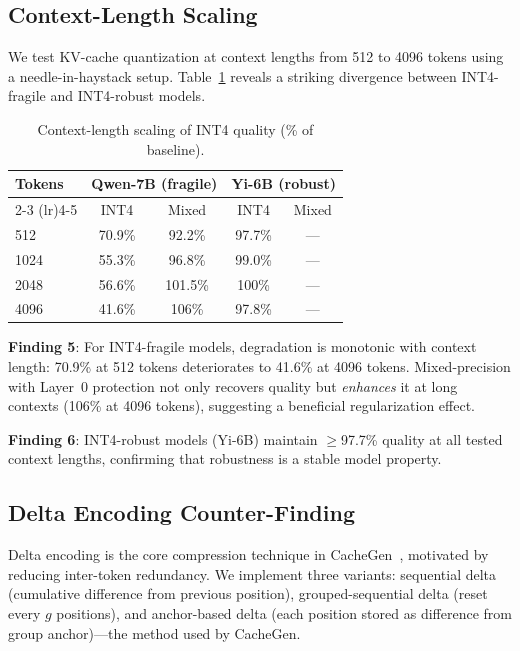 \documentclass[conference]{IEEEtran}
\begin{document}
\subsection{Context-Length Scaling}

We test KV-cache quantization at context lengths from 512 to 4096 tokens using a needle-in-haystack setup.
Table~\ref{tab:context_scaling} reveals a striking divergence between INT4-fragile and INT4-robust models.

\begin{table}[t]
\centering
\caption{Context-length scaling of INT4 quality (\% of baseline).}
\label{tab:context_scaling}
\small
\begin{tabular}{@{}lcccc@{}}
\toprule
\textbf{Tokens} & \multicolumn{2}{c}{\textbf{Qwen-7B (fragile)}} & \multicolumn{2}{c}{\textbf{Yi-6B (robust)}} \\
\cmidrule(lr){2-3} \cmidrule(lr){4-5}
& INT4 & Mixed & INT4 & Mixed \\
\midrule
512   & 70.9\% & 92.2\%  & 97.7\% & --- \\
1024  & 55.3\% & 96.8\%  & 99.0\% & --- \\
2048  & 56.6\% & 101.5\% & 100\%  & --- \\
4096  & 41.6\% & 106\%   & 97.8\% & --- \\
\bottomrule
\end{tabular}
\end{table}

\textbf{Finding 5}: For INT4-fragile models, degradation is monotonic with context length: 70.9\% at 512 tokens deteriorates to 41.6\% at 4096 tokens.
Mixed-precision with Layer~0 protection not only recovers quality but \emph{enhances} it at long contexts (106\% at 4096 tokens), suggesting a beneficial regularization effect.

\textbf{Finding 6}: INT4-robust models (Yi-6B) maintain $\geq$97.7\% quality at all tested context lengths, confirming that robustness is a stable model property.

\subsection{Delta Encoding Counter-Finding}

Delta encoding is the core compression technique in CacheGen~\cite{cachegen}, motivated by reducing inter-token redundancy.
We implement three variants: sequential delta (cumulative difference from previous position), grouped-sequential delta (reset every $g$ positions), and anchor-based delta (each position stored as difference from group anchor)---the method used by CacheGen.
\end{document}
